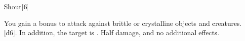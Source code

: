 \begin{spellsection}[Greater]{Shout}[6]
    \begin{spellheader}
    \end{spellheader}
    \begin{spellcontent}
        \begin{spelltargetinginfo}
        \end{spelltargetinginfo}
        \begin{spelleffects}
            \spellspecial You gain a  bonus to attack against brittle or crystalline objects and creatures.
            \spellsuccess {}[d6]. In addition, the target is \deafened.
            \spellfailure Half damage, and no additional effects.
        \end{spelleffects}
    \end{spellcontent}
    \begin{spellfooter}
        \miscastexplode
    \end{spellfooter}
\end{spellsection}

